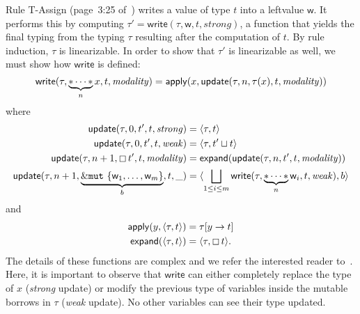 Rule \textsf{T-Assign} (page~3:25 of~\cite{Pearce21}) writes a value of type
$t$ into a leftvalue $\mathsf{w}$.
It performs this by computing $\tau'=\mathsf{write}(\tau,\mathsf{w},t,\mathit{strong})$,
a function that yields the final typing from the typing $\tau$ resulting after the computation of $t$.
By rule induction, $\tau$ is linearizable. In order to show that $\tau'$ is linearizable as well,
we must show how $\mathsf{write}$ is defined:
\[
\mathsf{write}(\tau,\underbrace{\mathtt{*}\cdots\mathtt{*}}_nx,t,\mathit{modality})=\mathsf{apply}
(x,\mathsf{update}(\tau,n,\tau(x),t,\mathit{modality}))
\]
where
\begin{align*}
  \mathsf{update}(\tau,0,t',t,\mathit{strong})&=\langle\tau,t\rangle\\
  \mathsf{update}(\tau,0,t',t,\mathit{weak})&=\langle\tau,t'\sqcup t\rangle\\
  \mathsf{update}(\tau,n+1,\boxempty\,{t'},t,\mathit{modality})
  &=\mathsf{expand}(\mathsf{update}(\tau,n,t',t,\mathit{modality}))\\
  \mathsf{update}(\tau,n+1,\underbrace{\&\mathtt{mut}\ \{\mathsf{w}_1,\ldots,\mathsf{w}_m\}}_b,t,\_)&=
    \langle\bigsqcup\limits_{1\le i\le m}\mathsf{write}(\tau,\underbrace{\mathtt{*}\cdots\mathtt{*}}_n\mathsf{w}_i,t,\mathit{weak}),b\rangle
\end{align*}
and
\begin{align*}
  \mathsf{apply}(y,\langle\tau,t\rangle)&=\tau[y\to t]\\
  \mathsf{expand}(\langle\tau,t\rangle)&=\langle\tau,\boxempty\,{t}\rangle.
\end{align*}
%
The details of these functions
are complex and we refer the interested reader to~\cite{Pearce21}.
Here, it is important to observe that $\mathsf{write}$
can either completely replace the type of $x$
(\emph{strong} update) or modify the previous type of variables
inside the mutable borrows in $\tau$ (\emph{weak} update).
No other variables can see their type updated.

